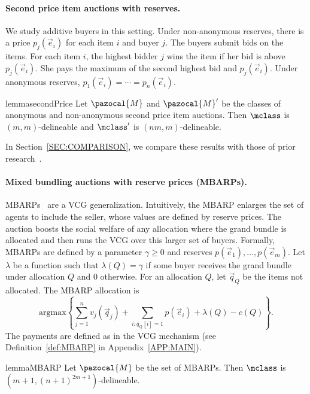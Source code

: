 \paragraph{Second price item auctions with reserves.} We study additive buyers in this setting. Under non-anonymous reserves, there is a price $p_j\left(\vec{e}_i\right)$ for each item $i$ and buyer $j$. The buyers submit bids on the items. For each item $i$, the highest bidder $j$ wins the item if her bid is above $p_j\left(\vec{e}_i\right)$. She pays the maximum of the second highest bid and $p_j\left(\vec{e}_i\right)$. Under anonymous reserves, $p_1\left(\vec{e}_i\right)  = \cdots = p_n\left(\vec{e}_i\right)$.
\begin{restatable}{lemma}{secondPrice}\label{lem:second_price}
Let $\pazocal{M}$ and $\pazocal{M}'$ be the classes of anonymous and non-anonymous second price item auctions. Then $\mclass$ is $\left(m, m\right)$-delineable and $\mclass'$ is $\left(nm, m\right)$-delineable.
\end{restatable}

In Section~\ref{SEC:COMPARISON}, we compare these results with those of prior research~\citep{Morgenstern16:Learning,Devanur16:Sample,Syrgkanis17:Sample}.

\paragraph{Mixed bundling auctions with reserve prices (MBARPs).}
MBARPs~\citep{Jehiel07:Mixed,Tang12:Mixed} are a VCG generalization.
Intuitively, the MBARP enlarges the set of agents to include the seller, whose values are defined by reserve prices. The auction boosts the social welfare of any allocation where the grand bundle is allocated and then runs the VCG over this larger set of buyers.
Formally, MBARPs are defined by a parameter $\gamma \geq 0$ and reserves $p\left(\vec{e}_1\right), \dots, p\left(\vec{e}_m\right)$. Let $\lambda$ be a function such that $\lambda\left(Q\right) = \gamma$ if some buyer receives the grand bundle under allocation $Q$ and 0 otherwise. For an allocation $Q$, let $\vec{q}_Q$ be the items not allocated. The MBARP allocation is \[\text{argmax}\left\{\sum_{j = 1}^n v_j\left(\vec{q}_j\right) + \sum_{i : q_Q[i] = 1} p\left(\vec{e}_i\right) + \lambda\left(Q\right) - c\left(Q\right)\right\}.\] The payments are defined as in the VCG mechanism (see Definition~\ref{def:MBARP} in Appendix~\ref{APP:MAIN}).

\begin{restatable}{lemma}{MBARP}\label{lem:MBARP}
Let $\pazocal{M}$ be the set of MBARPs. Then $\mclass$ is $\left(m+1, (n+1)^{2m+1}\right)$-delineable.
\end{restatable}



